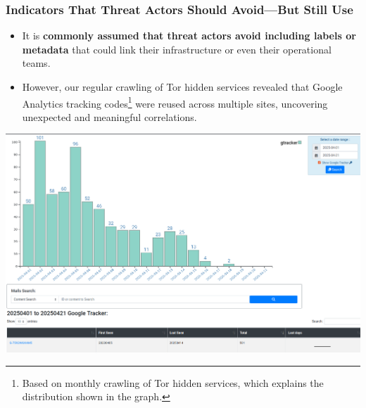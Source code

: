 \documentclass[10pt,aspectratio=169, colorlinks=true, linkcolor=circlBlue]{beamer}
\begin{document}
\begin{frame}
    \frametitle{Indicators That Threat Actors Should Avoid—But Still Use}
    \begin{itemize}
	    \item It is {\bf commonly assumed that threat actors avoid including labels or metadata} that could link their infrastructure or even their operational teams.
        \item However, our regular crawling of Tor hidden services revealed that Google Analytics tracking codes\footnote{Based on monthly crawling of Tor hidden services, which explains the distribution shown in the graph.} were reused across multiple sites, uncovering unexpected and meaningful correlations.
    \end{itemize}
    \begin{center}
        \includegraphics[scale=0.1]{./img/google-trackers.png}
    \end{center}
\end{frame}
\end{document}
